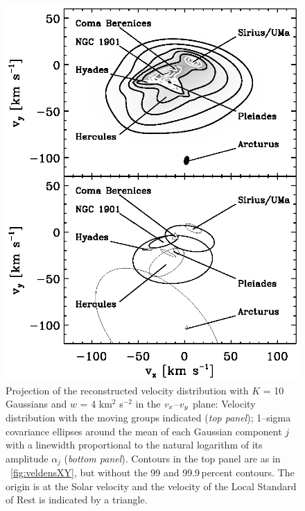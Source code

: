 \clearpage
\begin{figure}
\includegraphics[height=0.717\textheight]{figs_veldist/annotated_veldist2.ps}
\caption[Projection of the reconstructed velocity distribution with $K$ = 10 Gaussians and $w$ = 4 km$^2$ s$^{-2}$ in the $\vx$--$\vy$ plane with moving groups and 1--sigma covariance ellipses around the mean of each Gaussian component indicated]{Projection of the reconstructed velocity distribution with $K$ = 10 Gaussians and $w$ = 4 km$^2$ s$^{-2}$ in the $\vx$--$\vy$ plane: Velocity distribution with the moving groups indicated (\emph{top panel}); 1--sigma covariance ellipses around the mean of each Gaussian component $j$ with a linewidth proportional to the natural logarithm of its amplitude $\alpha_j$ (\emph{bottom panel}). Contours in the top panel are as in \figurename~\ref{fig:veldensXY}, but without the 99 and 99.9\,percent contours. The origin is at the Solar velocity and the velocity of the Local Standard of Rest \citep{2005ApJ...629..268H} is indicated by a triangle.}%
\label{fig:annotated_veldist2}
\end{figure}



